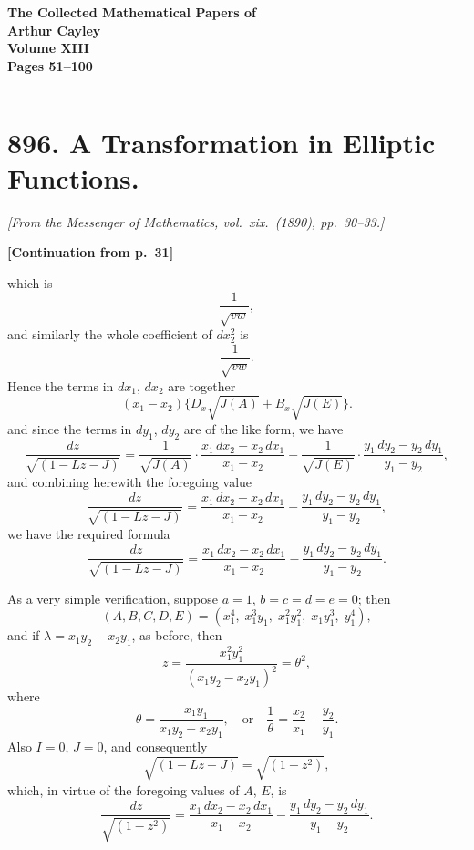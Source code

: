 \documentclass[11pt,a4paper]{article}
\theoremstyle{plain}
\begin{document}
\begin{center}
\Large\textbf{The Collected Mathematical Papers of}\\[4pt]
\LARGE\textbf{Arthur Cayley}\\[8pt]
\Large\textbf{Volume XIII}\\[12pt]
\large\textbf{Pages 51--100}
\end{center}

\vspace{1em}
\hrule
\vspace{1.5em}


\section*{896. A Transformation in Elliptic Functions.}

\noindent\textit{[From the Messenger of Mathematics, vol.\ xix.\ (1890), pp.\ 30--33.]}

\vspace{0.5em}
\noindent\textbf{[Continuation from p.\ 31]}

which is
$$
\frac{1}{\sqrt{vw}},
$$
and similarly the whole coefficient of $dx_2^2$ is
$$
\frac{1}{\sqrt{vw}}.
$$
Hence the terms in $dx_1$, $dx_2$ are together
$$
(x_1 - x_2)\{D_x\sqrt{J(A)} + B_x\sqrt{J(E)}\}.
$$
and since the terms in $dy_1$, $dy_2$ are of the like form, we have
$$
\frac{dz}{\sqrt{(1 - Lz - J)}} = \frac{1}{\sqrt{J(A)}} \cdot \frac{x_1\,dx_2 - x_2\,dx_1}{x_1 - x_2} - \frac{1}{\sqrt{J(E)}} \cdot \frac{y_1\,dy_2 - y_2\,dy_1}{y_1 - y_2},
$$
and combining herewith the foregoing value
$$
\frac{dz}{\sqrt{(1 - Lz - J)}} = \frac{x_1\,dx_2 - x_2\,dx_1}{x_1 - x_2} - \frac{y_1\,dy_2 - y_2\,dy_1}{y_1 - y_2},
$$
we have the required formula
$$
\frac{dz}{\sqrt{(1 - Lz - J)}} = \frac{x_1\,dx_2 - x_2\,dx_1}{x_1 - x_2} - \frac{y_1\,dy_2 - y_2\,dy_1}{y_1 - y_2}.
$$

As a very simple verification, suppose $a = 1$, $b = c = d = e = 0$; then
$$
(A, B, C, D, E) = (x_1^4,\; x_1^3 y_1,\; x_1^2 y_1^2,\; x_1 y_1^3,\; y_1^4),
$$
and if $\lambda = x_1 y_2 - x_2 y_1$, as before, then
$$
z = \frac{x_1^2 y_1^2}{(x_1 y_2 - x_2 y_1)^2} = \theta^2,
$$
where
$$
\theta = \frac{-x_1 y_1}{x_1 y_2 - x_2 y_1}, \quad \text{or} \quad \frac{1}{\theta} = \frac{x_2}{x_1} - \frac{y_2}{y_1}.
$$
Also $I = 0$, $J = 0$, and consequently
$$
\sqrt{(1 - Lz - J)} = \sqrt{(1 - z^2)},
$$
which, in virtue of the foregoing values of $A$, $E$, is
$$
\frac{dz}{\sqrt{(1 - z^2)}} = \frac{x_1\,dx_2 - x_2\,dx_1}{x_1 - x_2} - \frac{y_1\,dy_2 - y_2\,dy_1}{y_1 - y_2}.
$$
\end{document}
